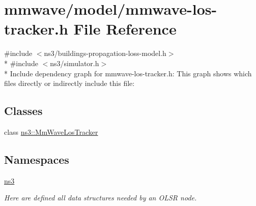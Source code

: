 \hypertarget{mmwave-los-tracker_8h}{}\section{mmwave/model/mmwave-\/los-\/tracker.h File Reference}
\label{mmwave-los-tracker_8h}
{\ttfamily \#include $<$ns3/buildings-\/propagation-\/loss-\/model.\+h$>$}\\*
{\ttfamily \#include $<$ns3/simulator.\+h$>$}\\*
Include dependency graph for mmwave-\/los-\/tracker.h\+:
This graph shows which files directly or indirectly include this file\+:
\subsection*{Classes}
\begin{DoxyCompactItemize}
\item 
class \hyperlink{classns3_1_1MmWaveLosTracker}{ns3\+::\+Mm\+Wave\+Los\+Tracker}
\end{DoxyCompactItemize}
\subsection*{Namespaces}
\begin{DoxyCompactItemize}
\item 
 \hyperlink{namespacens3}{ns3}
\begin{DoxyCompactList}\small\item\em Here are defined all data structures needed by an O\+L\+SR node. \end{DoxyCompactList}\end{DoxyCompactItemize}

